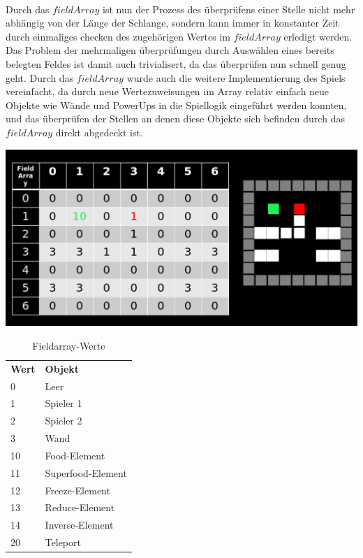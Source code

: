 \\
Durch das $fieldArray$ ist nun der Prozess des {\"u}berpr{\"u}fens einer Stelle nicht mehr abh{\"a}ngig von der L{\"a}nge der Schlange, sondern kann immer in konstanter Zeit durch einmaliges checken des zugeh{\"o}rigen Wertes im $fieldArray$ erledigt werden. Das Problem der mehrmaligen {\"u}berpr{\"u}fungen durch Ausw{\"a}hlen eines bereits belegten Feldes ist damit auch trivialisert, da das {\"u}berpr{\"u}fen nun schnell genug geht. Durch das $fieldArray$ wurde auch die weitere Implementierung des Spiels vereinfacht, da durch neue Wertezuweisungen im Array relativ einfach neue Objekte wie W{\"a}nde und PowerUps in die Spiellogik eingef{\"u}hrt werden konnten, und das {\"u}berpr{\"u}fen der Stellen an denen diese Objekte sich befinden durch das $fieldArray$ direkt abgedeckt ist.

\begin{minipage}[X]{1.1\textwidth}
 \centering
 \includegraphics[scale=0.3]{bilder/FieldArraySpielfeld}
 \label{fig:FieldArraySpielfeld}
\end{minipage}


\begin{table}
     \centering
     \begin{tabular}{ll}
       \textbf{Wert}  & \textbf{Objekt} \\
       0          & Leer                 \\
       1         & Spieler 1             \\
       2         & Spieler 2             \\
       3         & Wand                 \\
       10        & Food-Element             \\
       11        & Superfood-Element             \\
       12        & Freeze-Element             \\
       13        & Reduce-Element             \\
       14        & Inverse-Element             \\
       20        & Teleport             \\
     \end{tabular}

     \caption{Fieldarray-Werte}
     \label{tbl:Fieldarray-Werte}

   \end{table}





